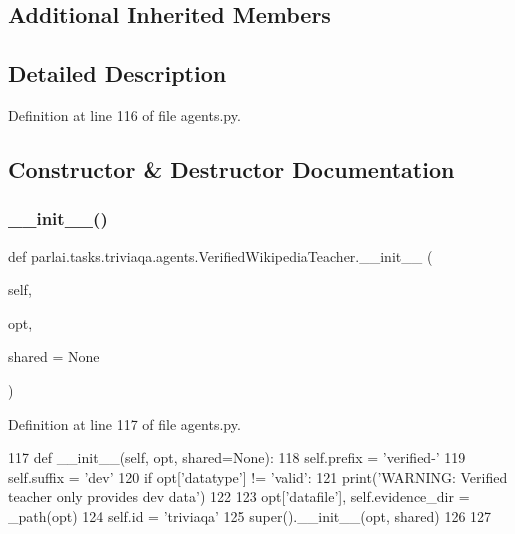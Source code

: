 \subsection*{Additional Inherited Members}


\subsection{Detailed Description}


Definition at line 116 of file agents.\+py.



\subsection{Constructor \& Destructor Documentation}
\mbox{\label{classparlai_1_1tasks_1_1triviaqa_1_1agents_1_1VerifiedWikipediaTeacher_a6af307d6cf32536d5a860a0481bea4a5}} 
\subsubsection{\texorpdfstring{\+\_\+\+\_\+init\+\_\+\+\_\+()}{\_\_init\_\_()}}
{\footnotesize\ttfamily def parlai.\+tasks.\+triviaqa.\+agents.\+Verified\+Wikipedia\+Teacher.\+\_\+\+\_\+init\+\_\+\+\_\+ (\begin{DoxyParamCaption}\item[{}]{self,  }\item[{}]{opt,  }\item[{}]{shared = {\ttfamily None} }\end{DoxyParamCaption})}



Definition at line 117 of file agents.\+py.


\begin{DoxyCode}
117     \textcolor{keyword}{def }\_\_init\_\_(self, opt, shared=None):
118         self.prefix = \textcolor{stringliteral}{'verified-'}
119         self.suffix = \textcolor{stringliteral}{'dev'}
120         \textcolor{keywordflow}{if} opt[\textcolor{stringliteral}{'datatype'}] != \textcolor{stringliteral}{'valid'}:
121             print(\textcolor{stringliteral}{'WARNING: Verified teacher only provides dev data'})
122 
123         opt[\textcolor{stringliteral}{'datafile'}], self.evidence\_dir = \_path(opt)
124         self.id = \textcolor{stringliteral}{'triviaqa'}
125         super().\_\_init\_\_(opt, shared)
126 
127 
\end{DoxyCode}


